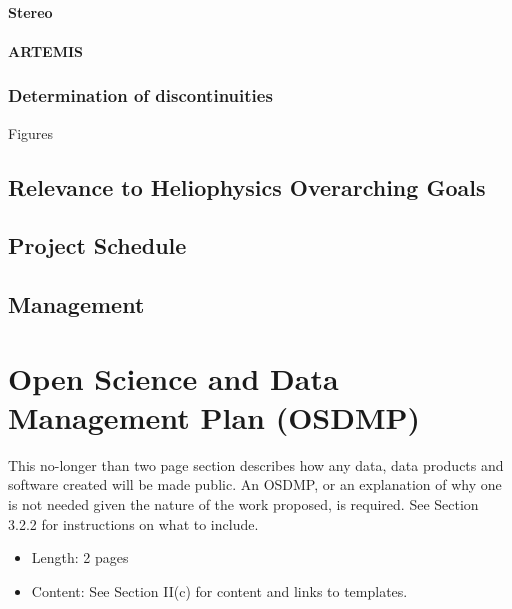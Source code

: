 \documentclass[
  letterpaper,
  DIV=11,
  numbers=noendperiod,
  oneside]{scrartcl}
\let\oldparagraph\paragraph
\renewcommand{\paragraph}[1]{\oldparagraph{#1}\mbox{}}
\providecommand{\tightlist}{%
  \setlength{\itemsep}{0pt}\setlength{\parskip}{0pt}}\usepackage{longtable,booktabs,array}
\begin{document}
\paragraph{Stereo}

\paragraph{ARTEMIS}

\subsubsection{Determination of
discontinuities}\label{determination-of-discontinuities}

Figures

\subsection{Relevance to Heliophysics Overarching
Goals}\label{relevance-to-heliophysics-overarching-goals}

\subsection{Project Schedule}\label{project-schedule}

\subsection{Management}\label{management}

\newpage{}

\section{Open Science and Data Management Plan
(OSDMP)}\label{open-science-and-data-management-plan-osdmp}

\begin{tcolorbox}[enhanced jigsaw, breakable, colframe=quarto-callout-note-color-frame, colback=white, titlerule=0mm, left=2mm, leftrule=.75mm, opacitybacktitle=0.6, coltitle=black, title=\textcolor{quarto-callout-note-color}{\faInfo}\hspace{0.5em}{Note}, bottomtitle=1mm, toprule=.15mm, arc=.35mm, toptitle=1mm, rightrule=.15mm, opacityback=0, colbacktitle=quarto-callout-note-color!10!white, bottomrule=.15mm]

This no-longer than two page section describes how any data, data
products and software created will be made public. An OSDMP, or an
explanation of why one is not needed given the nature of the work
proposed, is required. See Section 3.2.2 for instructions on what to
include.

\begin{itemize}
\tightlist
\item
  Length: 2 pages
\item
  Content: See Section II(c) for content and links to templates.
\end{itemize}

\end{tcolorbox}
\end{document}
